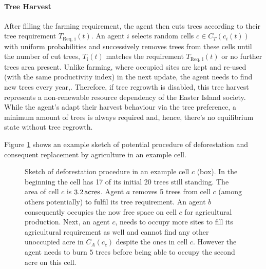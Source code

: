 \paragraph{Tree Harvest}
After filling the farming requirement, the agent then cuts trees according to their tree requirement $T_\text{Req, i}(t)$.
An agent $i$ selects random cells $c\in C_T(c_i(t))$ with uniform probabilities and successively removes trees from these cells until the number of cut trees, $T_\text{i}(t)$ matches the requirement $T_\text{Req, i}(t)$ or no further trees area present. 
Unlike farming, where occupied sites are kept and re-used (with the same productivity index) in the next update, the agent needs to find new trees every year,.%
Therefore, if tree regrowth is disabled, this tree harvest represents a non-renewable resource dependency of the Easter Island society.
While the agent's adapt their harvest behaviour via the tree preference, a minimum amount of trees is always required and, hence, there's no equilibrium state without tree regrowth.

Figure \TODO \ref{fig:treeburning} shows an example sketch of potential procedure of deforestation and consequent replacement by agriculture in an example cell. 

\begin{figure}
	\centering
	\caption{Sketch of deforestation procedure in an example cell $c$ (box). 
		In the beginning the cell has 17 of its initial 20 trees still standing. 
		The area of cell $c$ is $3.2\, \rm{acres}$. 
		Agent $a$ removes 5 trees from cell $c$ (among others potentially) to fulfil its tree requirement. An agent $b$ consequently occupies the now free space on cell $c$ for agricultural production. 
		Next, an agent $c$, needs to occupy more sites to fill its agricultural requirement as well and cannot find any other unoccupied acre in $C_A(c_c)$ despite the ones in cell $c$. 
		However the agent needs to burn $5$ trees before being able to occupy the second acre on this cell.}
	\label{fig:treeburning}
\end{figure}

